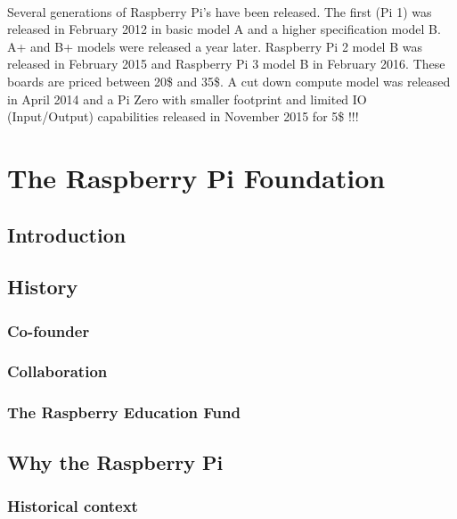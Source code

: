 \documentclass[10pt,a4paper]{article}
\begin{document}
\paragraph{}Several generations of Raspberry Pi's have been released. The first (Pi 1) was released in February 2012 in basic model A and a higher specification model B. A+ and B+ models were released a year later. Raspberry Pi 2 model B was released in February 2015 and Raspberry Pi 3 model B in February 2016. These boards are priced between 20\$ and 35\$. A cut down compute model was released in April 2014 and a Pi Zero with smaller footprint and limited IO (Input/Output) capabilities released in November 2015 for 5\$ !!!

\newpage

\tableofcontents

\newpage

\section{The Raspberry Pi Foundation}

\subsection{Introduction}

\subsection{History}

\subsubsection{Co-founder}

\subsubsection{Collaboration}

\subsubsection{The Raspberry Education Fund}


\subsection{Why the Raspberry Pi}

\subsubsection{Historical context}
\end{document}
